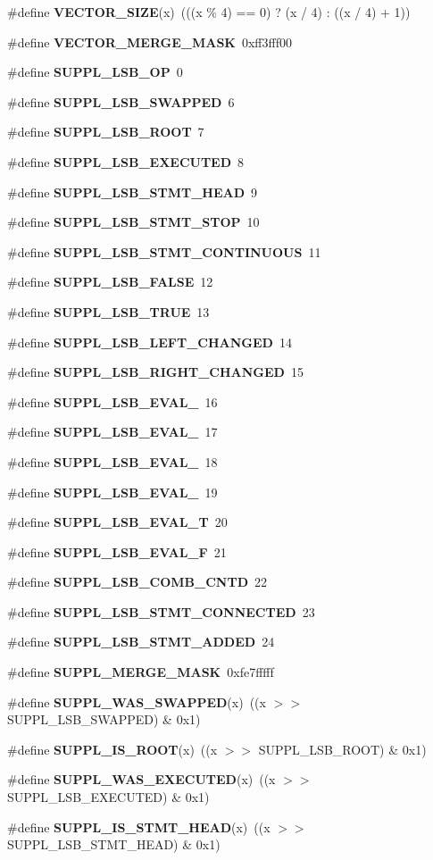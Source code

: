 \begin{CompactItemize}
\#define {\bf VECTOR\_\-SIZE}(x)\ (((x \% 4) == 0) ? (x / 4) : ((x / 4) + 1))
\item 
\#define {\bf VECTOR\_\-MERGE\_\-MASK}\ 0xff3fff00
\item 
\#define {\bf SUPPL\_\-LSB\_\-OP}\ 0
\item 
\#define {\bf SUPPL\_\-LSB\_\-SWAPPED}\ 6
\item 
\#define {\bf SUPPL\_\-LSB\_\-ROOT}\ 7
\item 
\#define {\bf SUPPL\_\-LSB\_\-EXECUTED}\ 8
\item 
\#define {\bf SUPPL\_\-LSB\_\-STMT\_\-HEAD}\ 9
\item 
\#define {\bf SUPPL\_\-LSB\_\-STMT\_\-STOP}\ 10
\item 
\#define {\bf SUPPL\_\-LSB\_\-STMT\_\-CONTINUOUS}\ 11
\item 
\#define {\bf SUPPL\_\-LSB\_\-FALSE}\ 12
\item 
\#define {\bf SUPPL\_\-LSB\_\-TRUE}\ 13
\item 
\#define {\bf SUPPL\_\-LSB\_\-LEFT\_\-CHANGED}\ 14
\item 
\#define {\bf SUPPL\_\-LSB\_\-RIGHT\_\-CHANGED}\ 15
\item 
\#define {\bf SUPPL\_\-LSB\_\-EVAL\_}\ 16
\item 
\#define {\bf SUPPL\_\-LSB\_\-EVAL\_}\ 17
\item 
\#define {\bf SUPPL\_\-LSB\_\-EVAL\_}\ 18
\item 
\#define {\bf SUPPL\_\-LSB\_\-EVAL\_}\ 19
\item 
\#define {\bf SUPPL\_\-LSB\_\-EVAL\_\-T}\ 20
\item 
\#define {\bf SUPPL\_\-LSB\_\-EVAL\_\-F}\ 21
\item 
\#define {\bf SUPPL\_\-LSB\_\-COMB\_\-CNTD}\ 22
\item 
\#define {\bf SUPPL\_\-LSB\_\-STMT\_\-CONNECTED}\ 23
\item 
\#define {\bf SUPPL\_\-LSB\_\-STMT\_\-ADDED}\ 24
\item 
\#define {\bf SUPPL\_\-MERGE\_\-MASK}\ 0xfe7fffff
\item 
\#define {\bf SUPPL\_\-WAS\_\-SWAPPED}(x)\ ((x $>$$>$ SUPPL\_\-LSB\_\-SWAPPED) \& 0x1)
\item 
\#define {\bf SUPPL\_\-IS\_\-ROOT}(x)\ ((x $>$$>$ SUPPL\_\-LSB\_\-ROOT) \& 0x1)
\item 
\#define {\bf SUPPL\_\-WAS\_\-EXECUTED}(x)\ ((x $>$$>$ SUPPL\_\-LSB\_\-EXECUTED) \& 0x1)
\item 
\#define {\bf SUPPL\_\-IS\_\-STMT\_\-HEAD}(x)\ ((x $>$$>$ SUPPL\_\-LSB\_\-STMT\_\-HEAD) \& 0x1)

\end{CompactItemize}
